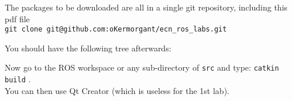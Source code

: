 \documentclass{ecnreport}
\newcommand{\ttt}[1]
{
{\tt{#1}}
}
\begin{document}
The packages to be downloaded are all in a single git repository, including this pdf file\\ \ttt{git clone git@github.com:oKermorgant/ecn\_ros\_labs.git}
You should have the following tree afterwards:
\begin{center}\begin{minipage}{.4\linewidth}
  \end{minipage}
\end{center}
Now go to the ROS workspace or any sub-directory of \ttt{src} and type: \ttt{catkin build}.\\ You can then use Qt Creator (which is useless for the 1st lab).
% 
% 
% 
% 
% 
% 
% 
% 
\end{document}

